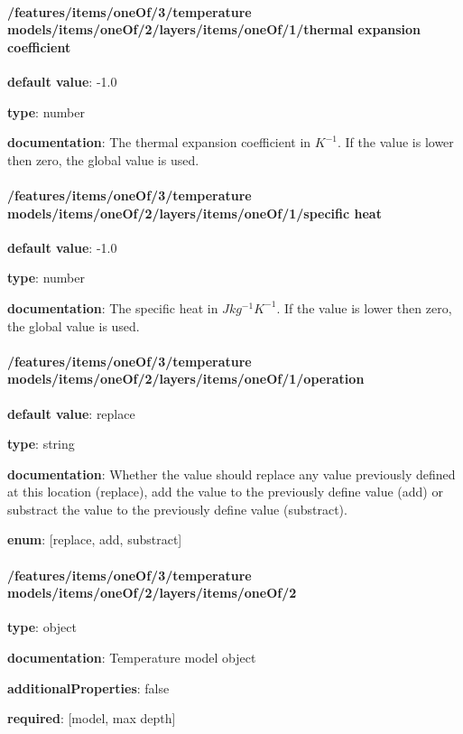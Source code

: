 \begin{itemized}
\end{itemized}\paragraph{/features/items/oneOf/3/temperature models/items/oneOf/2/layers/items/oneOf/1/thermal expansion coefficient} \begin{itemized}
\item {\bf default value}: -1.0
\item {\bf type}: number
\item {\bf documentation}: The thermal expansion coefficient in $K^{-1}$. If the value is lower then zero, the global value is used.
\end{itemized}\paragraph{/features/items/oneOf/3/temperature models/items/oneOf/2/layers/items/oneOf/1/specific heat} \begin{itemized}
\item {\bf default value}: -1.0
\item {\bf type}: number
\item {\bf documentation}: The specific heat in $J kg^{-1} K^{-1}$. If the value is lower then zero, the global value is used.
\end{itemized}\paragraph{/features/items/oneOf/3/temperature models/items/oneOf/2/layers/items/oneOf/1/operation} \begin{itemized}
\item {\bf default value}: replace
\item {\bf type}: string
\item {\bf documentation}: Whether the value should replace any value previously defined at this location (replace), add the value to the previously define value (add) or substract the value to the previously define value (substract).
\item {\bf enum}: [replace, add, substract]\end{itemized}\paragraph{/features/items/oneOf/3/temperature models/items/oneOf/2/layers/items/oneOf/2} \begin{itemized}
\item {\bf type}: object
\item {\bf documentation}: Temperature model object
\item {\bf additionalProperties}: false
\item {\bf required}: [model, max depth]\end{itemized}
